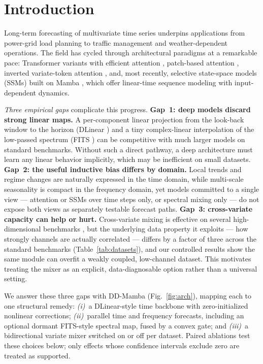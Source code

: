 \documentclass[runningheads]{llncs}
\newcommand{\model}{DD-Mamba}
\begin{document}
\section{Introduction}

Long-term forecasting of multivariate time series underpins applications
from power-grid load planning to traffic management and weather-dependent
operations. The field has cycled through architectural paradigms at a
remarkable pace: Transformer variants with efficient attention
\cite{informer,autoformer,fedformer}, patch-based attention
\cite{patchtst}, inverted variate-token attention \cite{itransformer},
and, most recently, selective state-space models (SSMs) built on Mamba
\cite{mamba,smamba}, which offer linear-time sequence modeling with
input-dependent dynamics.

\emph{Three empirical gaps} complicate this progress. \textbf{Gap~1: deep
models discard strong linear maps.} A per-component linear projection from
the look-back window to the horizon (DLinear \cite{dlinear}) and a tiny
complex-linear interpolation of the low-passed spectrum (FITS \cite{fits})
can be competitive with much larger models on standard benchmarks. Without
such a direct pathway, a deep architecture must learn any linear behavior
implicitly, which may be inefficient on small datasets.
\textbf{Gap~2: the useful inductive bias differs by domain.} Local trends
and regime changes are naturally expressed in the time domain, while
multi-scale seasonality is compact in the frequency domain, yet models
committed to a single view --- attention or SSMs over time steps only, or
spectral mixing only \cite{frets} --- do not expose both views as separately
testable forecast paths.
\textbf{Gap~3: cross-variate capacity can help or hurt.} Cross-variate
mixing is effective on several high-dimensional benchmarks
\cite{itransformer,smamba,crossformer}, but the underlying data property it
exploits --- how strongly channels are actually correlated --- differs by a
factor of three across the standard benchmarks (Table~\ref{tab:datasets}),
and our controlled results show the same module can overfit a weakly
coupled, low-channel dataset. This motivates treating the mixer as an
explicit, data-diagnosable option rather than a universal setting.

We answer these three gaps with \model{} (Fig.~\ref{fig:arch}), mapping
each to one structural remedy: \emph{(i)}~a DLinear-style time backbone with
zero-initialized nonlinear corrections; \emph{(ii)}~parallel time and
frequency forecasts, including an optional dormant FITS-style spectral map,
fused by a convex gate; and \emph{(iii)}~a bidirectional variate mixer
switched on or off per dataset. Paired ablations test these choices below;
only effects whose confidence intervals exclude zero are treated as supported.
\end{document}
